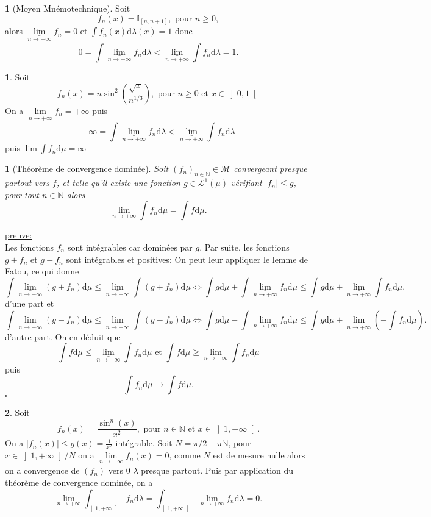 \documentclass[8pt,notheorems]{beamer}
\def \N{\mathbb N}
\def \limsup{\underset{n\rightarrow+\infty}{\overline{\lim}}}
\def \liminf{\underset{n\rightarrow+\infty}{\underline{\lim}}}
\newtheorem{theorem}{\translate{Theorem}}[section]
\newtheorem{theorem}{\translate{Theoreme}}
\theoremstyle{definition}
\theoremstyle{example}
\newtheorem{example}{\translate{Exemple}}
\newtheorem{remark}{\translate{Remarque}}
\theoremstyle{mystyle}
\theoremstyle{plain}
\begin{document}
\begin{frame}[allowframebreaks]
\begin{remark}[Moyen Mnémotechnique]
Soit
$$
f_n(x)=\mathbb{I}_{[n,n+1]}, \text{ pour }n\geq0,
$$
alors $\liminf f_n=0$ et $\int f_n(x)\text{d}\lambda(x)=1$ donc
$$
0=\int \liminf f_n\text{d}\lambda < \liminf \int f_n \text{d}\lambda=1.
$$
\end{remark}
\begin{example}
Soit
$$
f_n(x)=n\sin^2\left(\frac{\sqrt{x}}{n^{1/3}}\right),\text{ pour }n\geq0\text{ et }x\in \left]0,1\right[
$$
On a $\liminf f_n=+\infty$ puis
$$
+\infty=\int \liminf f_n\text{d}\lambda<\liminf\int f_n\text{d}\lambda
$$
puis $\lim\int f_n\text{d}\mu=\infty$
\end{example}
\begin{theorem}[Théorème de convergence dominée]
Soit $(f_n)_{n\in\N}\in\mathcal{M}$ convergeant presque partout vers $f$, et telle qu'il existe une fonction $g\in\mathcal{L}^{1}(\mu)$ vérifiant $|f_n|\leq g$, pour tout $n\in\N$ alors
$$
\underset{n\rightarrow+\infty}{\lim}\int f_n\text{d}\mu=\int f\text{d}\mu.
$$
\end{theorem}
\underline{preuve:}\\
Les fonctions $f_n$ sont intégrables car dominées par $g$. Par suite, les fonctions $g+f_n$ et $g-f_n$ sont intégrables et positives: On peut leur appliquer le lemme de Fatou, ce qui donne
$$
\int \liminf (g+f_n)\text{d}\mu\leq \liminf \int (g+f_n)\text{d}\mu\Leftrightarrow\int g\text{d}\mu+\int \liminf f_n\text{d}\mu\leq \int g\text{d}\mu+\liminf \int f_n\text{d}\mu.
$$
d'une part et
$$
\int \liminf (g-f_n)\text{d}\mu\leq \liminf \int (g-f_n)\text{d}\mu\Leftrightarrow\int g\text{d}\mu-\int \limsup f_n\text{d}\mu\leq  \int g\text{d}\mu + \liminf \left(-\int f_n\text{d}\mu\right).
$$
d'autre part. On en déduit que
$$
\int f\text{d}\mu \leq \liminf \int f_n\text{d}\mu\text{  et } \int f\text{d}\mu \geq \limsup \int f_n\text{d}\mu
$$
puis
$$
\int f_n\text{d}\mu\rightarrow \int f\text{d}\mu.
$$
\flushright$\square$
\begin{example}
Soit
$$
f_n(x)=\frac{\sin^n(x)}{x^2},\text{ pour }n\in\N \text{ et }x\in \left]1,+\infty\right[.
$$
On a $|f_n(x)|\leq g(x)=\frac{1}{x^2}$ intégrable. Soit $N=\pi/2 + \pi\mathbb{N}$, pour $x\in \left]1,+\infty\right[/N$ on a $\underset{n\rightarrow+\infty}{\lim} f_n(x)=0$, comme $N$ est de mesure nulle alors on a convergence de $(f_n)$ vers $0$ $\lambda$ presque partout. Puis par application du théorème de convergence dominée, on a
$$
\underset{n\rightarrow+\infty}{\lim}\int_{\left]1,+\infty\right[} f_n\text{d}\lambda=\int_{\left]1,+\infty\right[} \underset{n\rightarrow+\infty}{\lim} f_n\text{d}\lambda=0.
$$
\end{example}
\end{frame}
\end{document}
